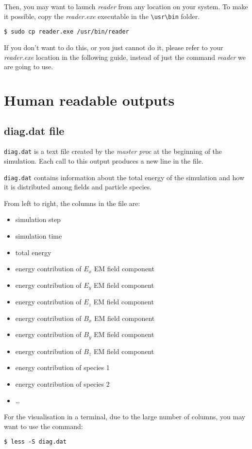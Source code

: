 \documentclass[11pt,a4paper]{report}
\begin{document}
Then, you may want to launch \emph{reader} from any location on your system. To make it possible, copy the \emph{reader.exe} executable in the \verb+\usr\bin+ folder.
\begin{verbatim}
$ sudo cp reader.exe /usr/bin/reader
\end{verbatim}
If you don't want to do this, or you just cannot do it, please refer to your \emph{reader.exe} location in the following guide, instead of just the command \emph{reader} we are going to use.

\section{Human readable outputs}
\subsection{diag.dat file}
\verb+diag.dat+ is a text file created by the \emph{master proc} at the beginning of the simulation. Each call to this output produces a new line in the file.

\verb+diag.dat+ contains information about the total energy of the simulation and how it is distributed among fields and particle species.

From left to right, the columns in the file are:
\begin{itemize}
\item simulation step
\item simulation time
\item total energy
\item energy contribution of $E_x$ EM field component
\item energy contribution of $E_y$ EM field component
\item energy contribution of $E_z$ EM field component
\item energy contribution of $B_x$ EM field component
\item energy contribution of $B_y$ EM field component
\item energy contribution of $B_z$ EM field component
\item energy contribution of species 1
\item energy contribution of species 2
\item \ldots
\end{itemize}
For the visualisation in a terminal, due to the large number of columns, you may want to use the command:
\begin{verbatim}
$ less -S diag.dat
\end{verbatim}
\end{document}
